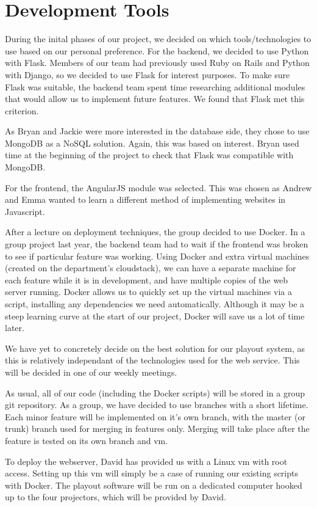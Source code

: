 \documentclass[a4paper]{article}
\begin{document}
\section{Development Tools}
During the inital phases of our project, we decided on which tools/technologies to use based on our personal preference. For the backend, we decided to use Python with Flask. Members of our team had previously used Ruby on Rails and Python with Django, so we decided to use Flask for interest purposes. To make sure Flask was suitable, the backend team spent time researching additional modules that would allow us to implement future features. We found that Flask met this criterion.

As Bryan and Jackie were more interested in the database side, they chose to use MongoDB as a NoSQL solution. Again, this was based on interest. Bryan used time at the beginning of the project to check that Flask was compatible with MongoDB. 

For the frontend, the AngularJS module was selected. This was chosen as Andrew and Emma wanted to learn a different method of implementing websites in Javascript. 

After a lecture on deployment techniques, the group decided to use Docker. In a group project last year, the backend team had to wait if the frontend was broken to see if particular feature was working. Using Docker and extra virtual machines (created on the department's cloudstack), we can have a separate machine for each feature while it is in development, and have multiple copies of the web server running. Docker allows us to quickly set up the virtual machines via a script, installing any dependencies we need automatically. Although it may be a steep learning curve at the start of our project, Docker will save us a lot of time later. 

We have yet to concretely decide on the best solution for our playout system, as this is relatively independant of the technologies used for the web service. This will be decided in one of our weekly meetings.

As usual, all of our code (including the Docker scripts) will be stored in a group git repository. As a group, we have decided to use branches with a short lifetime. Each minor feature will be implemented on it's own branch, with the master (or trunk) branch used for merging in features only. Merging will take place after the feature is tested on its own branch and vm. 

To deploy the webserver, David has provided us with a Linux vm with root access. Setting up this vm will simply be a case of running our existing scripts with Docker. The playout software will be run on a dedicated computer hooked up to the four projectors, which will be provided by David. 
\end{document}
